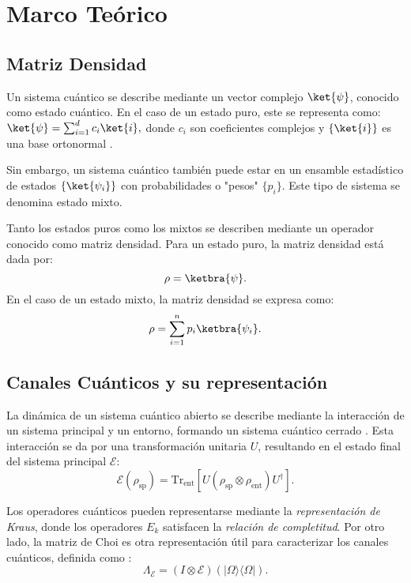 \section{Marco Teórico}

\subsection{Matriz Densidad}

Un sistema cuántico se describe mediante un vector complejo $\ket{\psi}$, conocido como estado cuántico. En el caso de un estado puro, este se representa como: 
$ \ket{\psi} = \sum_{i=1}^{d} c_i \ket{i}, $
donde $c_i$ son coeficientes complejos y $\{\ket{i}\}$ es una base ortonormal \cite{nielsen_chuang_2011}.

Sin embargo, un sistema cuántico también puede estar en un ensamble estadístico de estados $\{\ket{\psi_i}\}$ con probabilidades o "pesos" $\{p_i\}$. Este tipo de sistema se denomina estado mixto.

Tanto los estados puros como los mixtos se describen mediante un operador conocido como matriz densidad. Para un estado puro, la matriz densidad está dada por:
\begin{equation}
    \label{ec:1.5}
    \rho = \ketbra{\psi}.
\end{equation}
En el caso de un estado mixto, la matriz densidad se expresa como:
\begin{equation}
\label{dens_mixtos}
    \rho = \sum_{i=1}^{n} p_i \ketbra{\psi_i}.
\end{equation}




\subsection{Canales Cuánticos y su representación}
La dinámica de un sistema cuántico abierto se describe mediante la interacción de un sistema principal y un entorno, formando un sistema cuántico cerrado \cite{nielsen_chuang_2011}. Esta interacción se da por una transformación unitaria $U$, resultando en el estado final del sistema principal $\mathcal{E}$:
\begin{equation}
    \mathcal{E}(\rho_{\text{sp}}) = \text{Tr}_{\text{ent}}[ U( \rho_{\text{sp}} \otimes \rho_{\text{ent}} ) U^\dagger ].
\end{equation}

Los operadores cuánticos pueden representarse mediante la \textit{representación de Kraus}, donde los operadores ${E_k}$ satisfacen la \textit{relación de completitud}.  Por otro lado, la matriz de Choi es otra representación útil para caracterizar los canales cuánticos, definida como \cite{Choi2024}:
\begin{equation}
\Lambda_{\mathcal{E}} = (I \otimes \mathcal{E})(|\Omega\rangle\langle\Omega|).
\end{equation}

